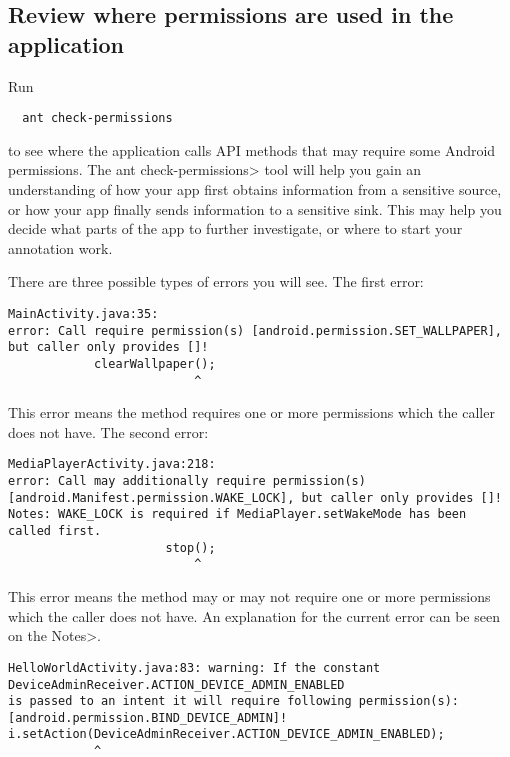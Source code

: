 \subsection{Review where permissions are used in the application}
\label{sec:appanalysis/check-permissions}


Run

\begin{Verbatim}
  ant check-permissions
\end{Verbatim}

\noindent
to see where the application calls API methods that may require some Android permissions.  
The \<ant check-permissions> tool will help you gain an understanding of how your
app first obtains information from a sensitive source, or how your app
finally sends information to a sensitive sink.  This may help you decide
what parts of the app to further investigate, or where to start your
annotation work.

There are three possible types of errors you will see. The first error:

\begin{Verbatim}
MainActivity.java:35: 
error: Call require permission(s) [android.permission.SET_WALLPAPER], 
but caller only provides []!
			clearWallpaper();
			              ^
\end{Verbatim}
This error means the method requires one or more permissions which the caller does not have.
The second error:

\begin{Verbatim}
MediaPlayerActivity.java:218:
error: Call may additionally require permission(s) 
[android.Manifest.permission.WAKE_LOCK], but caller only provides []! 
Notes: WAKE_LOCK is required if MediaPlayer.setWakeMode has been called first.
			          stop();
			              ^
\end{Verbatim}

This error means the method may or may not require one or more permissions which the caller
does not have. An explanation for the current error can be seen on the \<Notes>. 

\begin{Verbatim}
HelloWorldActivity.java:83: warning: If the constant DeviceAdminReceiver.ACTION_DEVICE_ADMIN_ENABLED 
is passed to an intent it will require following permission(s): [android.permission.BIND_DEVICE_ADMIN]! 
i.setAction(DeviceAdminReceiver.ACTION_DEVICE_ADMIN_ENABLED);
            ^
\end{Verbatim}

